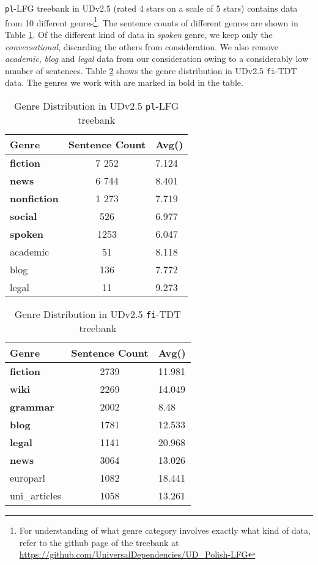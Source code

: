 \verb|pl|-LFG treebank in UDv2.5 (rated 4 stars on a scale of 5 stars) contains data from 10 different genres\footnote{For understanding of what genre category involves exactly what kind of data, refer to the github page of the treebank at \url{https://github.com/UniversalDependencies/UD_Polish-LFG}}. The sentence counts of different genres are shown in Table \ref{tab:genre_pl}. Of the different kind of data in \textit{spoken} genre, we keep only the \textit{conversational}, discarding the others from consideration. We also remove \textit{academic}, \textit{blog} and \textit{legal} data from our consideration owing to a considerably low number of sentences. Table \ref{tab:genre_fi} shows the genre distribution in UDv2.5 \texttt{fi}-TDT data. The genres we work with are marked in bold in the table. 

\begin{table}[H]
    \centering
    \begin{tabular}{|l|c|l|}
        \hline
        \textbf{Genre} & \textbf{Sentence Count} & \textbf{Avg()}\\
        \hline
        \hline
        \textbf{fiction} & 7 252 & 7.124 \\
        \textbf{news} & 6 744 & 8.401\\
        \textbf{nonfiction} & 1 273 & 7.719\\
        \textbf{social} & 526 & 6.977\\
        \textbf{spoken} & 1253 & 6.047\\
        academic & 51 & 8.118\\
        blog & 136 & 7.772\\
        legal & 11 & 9.273\\ 
        \hline
    \end{tabular}
    \caption{Genre Distribution in UDv2.5 \texttt{pl}-LFG treebank}
    \label{tab:genre_pl}
\end{table}

\begin{table}[H]
    \centering
    \begin{tabular}{|l|c|l|}
        \hline
        \textbf{Genre} & \textbf{Sentence Count} & \textbf{Avg()}\\
        \hline
        \hline
        \textbf{fiction} & 2739 & 11.981\\
        \textbf{wiki} & 2269 & 14.049\\
        \textbf{grammar} & 2002 & 8.48\\
        \textbf{blog} & 1781 & 12.533\\
        \textbf{legal} & 1141 & 20.968\\
        \textbf{news} & 3064 & 13.026\\ 
        europarl & 1082 & 18.441\\
        uni\_articles & 1058 & 13.261\\
        \hline
    \end{tabular}
    \caption{Genre Distribution in UDv2.5 \texttt{fi}-TDT treebank}
    \label{tab:genre_fi}
\end{table}


